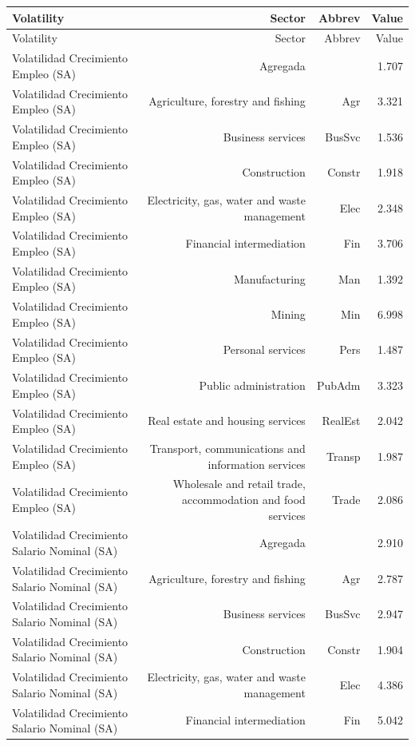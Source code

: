 \begin{longtable}{lrrr}
\hline
Volatility & Sector & Abbrev & Value \\ 
\hline\endfirsthead
\hline
Volatility & Sector & Abbrev & Value \\ 
\hline\endhead
Volatilidad Crecimiento Empleo (SA) & Agregada &  & 1.707 \\ 
Volatilidad Crecimiento Empleo (SA) & Agriculture, forestry and fishing & Agr & 3.321 \\ 
Volatilidad Crecimiento Empleo (SA) & Business services & BusSvc & 1.536 \\ 
Volatilidad Crecimiento Empleo (SA) & Construction & Constr & 1.918 \\ 
Volatilidad Crecimiento Empleo (SA) & Electricity, gas, water and waste management & Elec & 2.348 \\ 
Volatilidad Crecimiento Empleo (SA) & Financial intermediation & Fin & 3.706 \\ 
Volatilidad Crecimiento Empleo (SA) & Manufacturing & Man & 1.392 \\ 
Volatilidad Crecimiento Empleo (SA) & Mining & Min & 6.998 \\ 
Volatilidad Crecimiento Empleo (SA) & Personal services & Pers & 1.487 \\ 
Volatilidad Crecimiento Empleo (SA) & Public administration & PubAdm & 3.323 \\ 
Volatilidad Crecimiento Empleo (SA) & Real estate and housing services & RealEst & 2.042 \\ 
Volatilidad Crecimiento Empleo (SA) & Transport, communications and information services & Transp & 1.987 \\ 
Volatilidad Crecimiento Empleo (SA) & Wholesale and retail trade, accommodation and food services & Trade & 2.086 \\ 
Volatilidad Crecimiento Salario Nominal (SA) & Agregada &  & 2.910 \\ 
Volatilidad Crecimiento Salario Nominal (SA) & Agriculture, forestry and fishing & Agr & 2.787 \\ 
Volatilidad Crecimiento Salario Nominal (SA) & Business services & BusSvc & 2.947 \\ 
Volatilidad Crecimiento Salario Nominal (SA) & Construction & Constr & 1.904 \\ 
Volatilidad Crecimiento Salario Nominal (SA) & Electricity, gas, water and waste management & Elec & 4.386 \\ 
Volatilidad Crecimiento Salario Nominal (SA) & Financial intermediation & Fin & 5.042 \\ 

\end{longtable}
